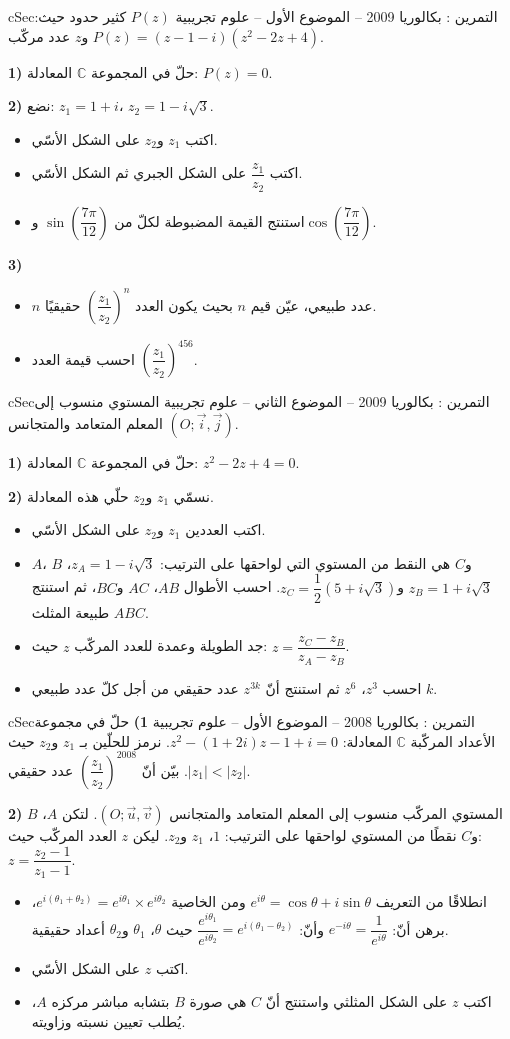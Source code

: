\documentclass[12pt,a4paper]{article}
\newenvironment{BOX}[2]{\begin{otherlanguage}{english}\begin{arbox}{#1}{#2}}{\end{arbox}\end{otherlanguage}}
\newcounter{exo}
\newenvironment{tamrin}[1]{\stepcounter{exo}\begin{BOX}{cSec}{التمرين \theexo: #1}}{\end{BOX}}
\newenvironment{sq}{\begin{itemize}[leftmargin=2.4em,itemsep=3pt]}{\end{itemize}}
\newcommand{\qa}{\item[(أ)]}\newcommand{\qb}{\item[(ب)]}\newcommand{\qc}{\item[(جـ)]}\newcommand{\qd}{\item[(د)]}\newcommand{\qe}{\item[(هـ)]}
\begin{document}
\begin{tamrin}{بكالوريا 2009 -- الموضوع الأول -- علوم تجريبية}
$P(z)$ كثير حدود حيث: $P(z)=(z-1-i)(z^2-2z+4)$ و$z$ عدد مركّب.

\textbf{1)} حلّ في المجموعة $\mathbb{C}$ المعادلة: $P(z)=0$.

\textbf{2)} نضع: $z_1=1+i$، $z_2=1-i\sqrt3$.
\begin{sq}
\qa اكتب $z_1$ و$z_2$ على الشكل الأسّي.
\qb اكتب $\dfrac{z_1}{z_2}$ على الشكل الجبري ثم الشكل الأسّي.
\qc استنتج القيمة المضبوطة لكلّ من $\sin\left(\dfrac{7\pi}{12}\right)$ و$\cos\left(\dfrac{7\pi}{12}\right)$.
\end{sq}
\textbf{3)}
\begin{sq}
\qa $n$ عدد طبيعي، عيّن قيم $n$ بحيث يكون العدد $\left(\dfrac{z_1}{z_2}\right)^{n}$ حقيقيًا.
\qb احسب قيمة العدد $\left(\dfrac{z_1}{z_2}\right)^{456}$.
\end{sq}
\end{tamrin}

\begin{tamrin}{بكالوريا 2009 -- الموضوع الثاني -- علوم تجريبية}
المستوي منسوب إلى المعلم المتعامد والمتجانس $(O;\vec i,\vec j)$.

\textbf{1)} حلّ في المجموعة $\mathbb{C}$ المعادلة: $z^2-2z+4=0$.

\textbf{2)} نسمّي $z_1$ و$z_2$ حلّي هذه المعادلة.
\begin{sq}
\qa اكتب العددين $z_1$ و$z_2$ على الشكل الأسّي.
\qb $A$، $B$ و$C$ هي النقط من المستوي التي لواحقها على الترتيب: $z_A=1-i\sqrt3$، $z_B=1+i\sqrt3$ و$z_C=\dfrac12\left(5+i\sqrt3\right)$.
احسب الأطوال $AB$، $AC$ و$BC$، ثم استنتج طبيعة المثلث $ABC$.
\qc جد الطويلة وعمدة للعدد المركّب $z$ حيث: $z=\dfrac{z_C-z_B}{z_A-z_B}$.
\qd احسب $z^3$، $z^6$ ثم استنتج أنّ $z^{3k}$ عدد حقيقي من أجل كلّ عدد طبيعي $k$.
\end{sq}
\end{tamrin}

\begin{tamrin}{بكالوريا 2008 -- الموضوع الأول -- علوم تجريبية}
\textbf{1)} حلّ في مجموعة الأعداد المركّبة $\mathbb{C}$ المعادلة: $z^2-(1+2i)z-1+i=0$.
نرمز للحلّين بـ $z_1$ و$z_2$ حيث $|z_1|<|z_2|$. بيّن أنّ $\left(\dfrac{z_1}{z_2}\right)^{2008}$ عدد حقيقي.

\textbf{2)} المستوي المركّب منسوب إلى المعلم المتعامد والمتجانس $(O;\vec u,\vec v)$.
لتكن $A$، $B$ و$C$ نقطًا من المستوي لواحقها على الترتيب: $1$، $z_1$ و$z_2$. ليكن $z$ العدد المركّب حيث: $z=\dfrac{z_2-1}{z_1-1}$.
\begin{sq}
\qa انطلاقًا من التعريف $e^{i\theta}=\cos\theta+i\sin\theta$ ومن الخاصية $e^{i(\theta_1+\theta_2)}=e^{i\theta_1}\times e^{i\theta_2}$،
برهن أنّ: $e^{-i\theta}=\dfrac{1}{e^{i\theta}}$ وأنّ: $\dfrac{e^{i\theta_1}}{e^{i\theta_2}}=e^{i(\theta_1-\theta_2)}$ حيث $\theta$، $\theta_1$ و$\theta_2$ أعداد حقيقية.
\qb اكتب $z$ على الشكل الأسّي.
\qc اكتب $z$ على الشكل المثلثي واستنتج أنّ $C$ هي صورة $B$ بتشابه مباشر مركزه $A$، يُطلب تعيين نسبته وزاويته.
\end{sq}
\end{tamrin}
\end{document}
